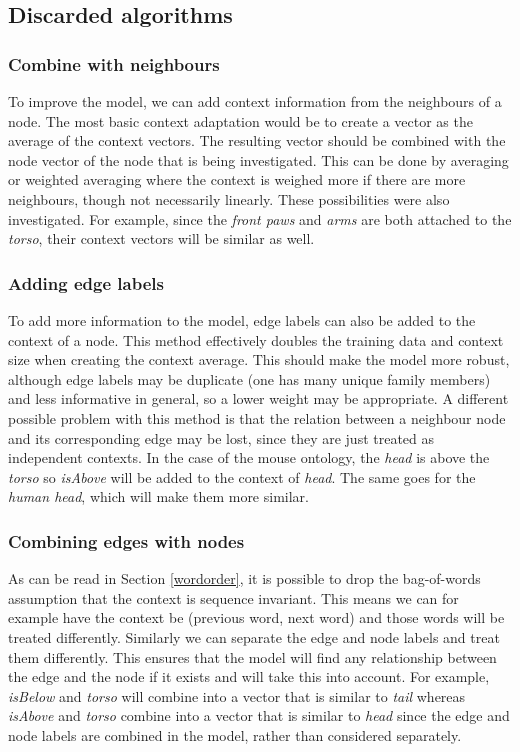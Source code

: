 \documentclass{article}
\begin{document}
 
 \subsection{Discarded algorithms}
  \subsubsection{Combine with neighbours}
  To improve the model, we can add context information from the neighbours of a node. The most basic context adaptation would be to create a vector as the average of the context vectors. The resulting vector should be combined with the node vector of the node that is being investigated. This can be done by averaging or weighted averaging where the context is weighed more if there are more neighbours, though not necessarily linearly. These possibilities were also investigated.
  For example, since the \emph{front paws} and \emph{arms} are both attached to the \emph{torso}, their context vectors will be similar as well.
  
  \subsubsection{Adding edge labels}
  To add more information to the model, edge labels can also be added to the context of a node. This method effectively doubles the training data and context size when creating the context average. This should make the model more robust, although edge labels may be duplicate (one has many unique family members) and less informative in general, so a lower weight may be appropriate. A different possible problem with this method is that the relation between a neighbour node and its corresponding edge may be lost, since they are just treated as independent contexts.
  In the case of the mouse ontology, the \emph{head} is above the \emph{torso} so \emph{isAbove} will be added to the context of \emph{head}. The same goes for the \emph{human head}, which will make them more similar.

  \subsubsection{Combining edges with nodes}
  As can be read in Section \ref{wordorder}, it is possible to drop the bag-of-words assumption that the context is sequence invariant.
  This means we can for example have the context be (previous word, next word) and those words will be treated differently. Similarly we can separate the edge and node labels and treat them differently. This ensures that the model will find any relationship between the edge and the node if it exists and will take this into account. For example, \emph{isBelow} and \emph{torso} will combine into a vector that is similar to \emph{tail} whereas \emph{isAbove} and \emph{torso} combine into a vector that is similar to \emph{head} since the edge and node labels are combined in the model, rather than considered separately.
 
\end{document}
